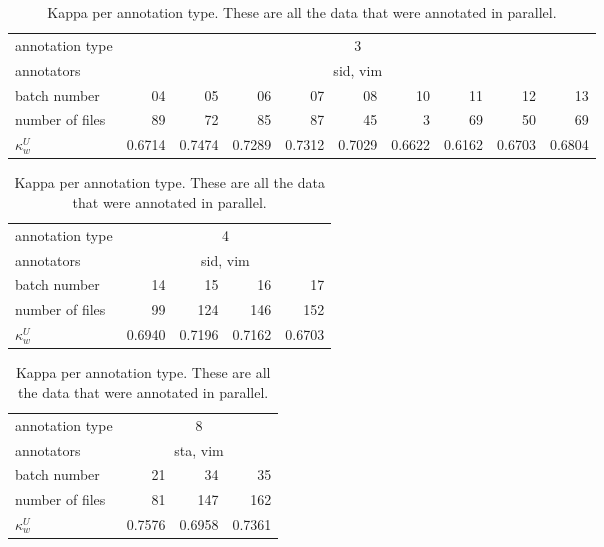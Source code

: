 \begin{table}[htdp]
\begin{small}
\begin{tabular}{l|r|r|r|r|r|r|r|r|r}
annotation type   & \multicolumn{9}{c}{3}   \\
annotators  & \multicolumn{9}{c}{sid, vim}  \\
batch number   & 04   & 05   & 06   & 07   & 08   & 10   & 11   & 12   & 13   \\
number of files & 89   & 72   & 85   & 87   & 45   & 3    & 69   & 50   & 69   \\
$\kappa_w^U$  & 0.6714 & 0.7474 & 0.7289 & 0.7312 & 0.7029 & 0.6622 & 0.6162 & 0.6703 & 0.6804 \\
\hline
\end{tabular}

\begin{tabular}{l|r|r|r|r}
annotation type & \multicolumn{4}{c}{4}  \\
annotators    & \multicolumn{4}{c}{sid, vim} \\
batch number    & 14   & 15   & 16   & 17   \\
number of files & 99   & 124  & 146  & 152  \\
$\kappa_w^U$    & 0.6940 & 0.7196 & 0.7162 & 0.6703 \\
\hline
\end{tabular}

\begin{tabular}{l|r|r|r}
annotation type & \multicolumn{3}{c}{8} \\
annotators    &  \multicolumn{3}{c}{sta, vim}\\
batch number    & 21   & 34   & 35   \\
number of files & 81   & 147  & 162  \\
$\kappa_w^U$    & 0.7576 & 0.6958 & 0.7361 \\
\end{tabular}
\caption{Kappa per annotation type. These are all the data that were annotated in parallel.}
\label{tab:kappa}
\end{small}
\end{table}%

